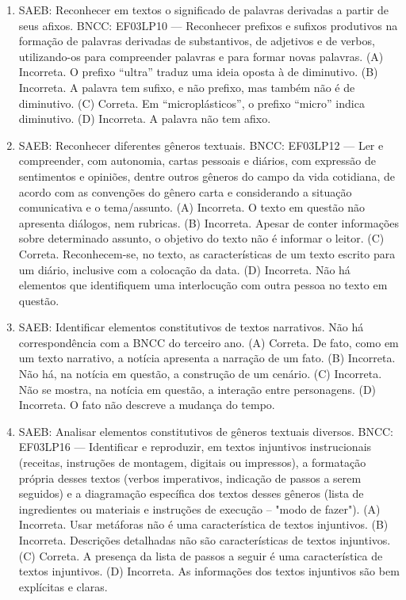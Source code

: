 \begin{enumerate}
\item
SAEB: Reconhecer em textos o significado de palavras derivadas a partir de seus afixos. 
BNCC: EF03LP10 --- Reconhecer prefixos e sufixos produtivos na formação de palavras derivadas de substantivos, de adjetivos e de verbos, utilizando-os para compreender palavras e para formar novas palavras. 
(A) Incorreta. O prefixo ``ultra'' traduz uma ideia oposta à de diminutivo. 
(B) Incorreta. A palavra tem sufixo, e não prefixo, mas também não é de diminutivo. 
(C) Correta. Em ``microplásticos'', o prefixo ``micro'' indica diminutivo.
(D) Incorreta. A palavra não tem afixo.

\item
SAEB: Reconhecer diferentes gêneros textuais. 
BNCC: EF03LP12 --- Ler e compreender, com autonomia, cartas pessoais e diários, com expressão de sentimentos e opiniões, dentre outros gêneros do campo da vida cotidiana, de acordo com as convenções do gênero carta e considerando a situação comunicativa e o tema/assunto. 
(A) Incorreta. O texto em questão não apresenta diálogos, nem rubricas. 
(B) Incorreta. Apesar de conter informações sobre determinado assunto, o objetivo do texto não é informar o leitor. 
(C) Correta. Reconhecem-se, no texto, as características de um texto escrito para um diário, inclusive com a colocação da data. 
(D) Incorreta. Não há elementos que identifiquem uma interlocução com outra pessoa no texto em questão.

\item
SAEB: Identificar elementos constitutivos de textos narrativos. Não há correspondência com a BNCC do terceiro ano. 
(A) Correta. De fato, como em um texto narrativo, a notícia apresenta a narração de um fato.
(B) Incorreta. Não há, na notícia em questão, a construção de um cenário. 
(C) Incorreta. Não se mostra, na notícia em questão, a interação entre personagens. 
(D) Incorreta. O fato não descreve a mudança do tempo.

\item
SAEB: Analisar elementos constitutivos de gêneros textuais diversos. 
BNCC: EF03LP16 --- Identificar e reproduzir, em textos injuntivos instrucionais (receitas, instruções de montagem, digitais ou impressos), a formatação própria desses textos (verbos imperativos, indicação de passos a serem seguidos) e a diagramação específica dos textos desses gêneros (lista de ingredientes ou materiais e instruções de execução -- "modo de fazer"). 
(A) Incorreta. Usar metáforas não é uma característica de textos injuntivos. 
(B) Incorreta. Descrições detalhadas não são características de textos injuntivos. 
(C) Correta. A presença da lista de passos a seguir é uma característica de textos injuntivos. 
(D) Incorreta. As informações dos textos injuntivos são bem explícitas e claras. 


\end{enumerate}
